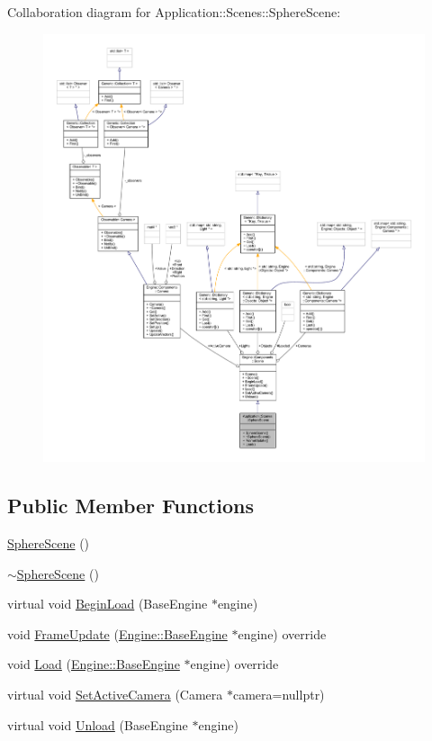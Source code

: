 Collaboration diagram for Application\+:\+:Scenes\+:\+:Sphere\+Scene\+:
\nopagebreak
\begin{figure}[H]
\begin{center}
\leavevmode
\includegraphics[width=350pt]{classApplication_1_1Scenes_1_1SphereScene__coll__graph}
\end{center}
\end{figure}
\subsection*{Public Member Functions}
\begin{DoxyCompactItemize}
\item 
\mbox{\hyperlink{classApplication_1_1Scenes_1_1SphereScene_a5880969092c7164e61a4236860c121c1}{Sphere\+Scene}} ()
\item 
\mbox{\hyperlink{classApplication_1_1Scenes_1_1SphereScene_a36617ce2362ace6514125d71d2fe41a9}{$\sim$\+Sphere\+Scene}} ()
\item 
virtual void \mbox{\hyperlink{classEngine_1_1Components_1_1Scene_af18bd334fe66952b8d79b8e9e99ab2d8}{Begin\+Load}} (Base\+Engine $\ast$engine)
\item 
void \mbox{\hyperlink{classApplication_1_1Scenes_1_1SphereScene_ad754dea94c77524a79d707436a933c66}{Frame\+Update}} (\mbox{\hyperlink{classEngine_1_1BaseEngine}{Engine\+::\+Base\+Engine}} $\ast$engine) override
\item 
void \mbox{\hyperlink{classApplication_1_1Scenes_1_1SphereScene_adf6f95bf2ac8f0e84935d04248407ba4}{Load}} (\mbox{\hyperlink{classEngine_1_1BaseEngine}{Engine\+::\+Base\+Engine}} $\ast$engine) override
\item 
virtual void \mbox{\hyperlink{classEngine_1_1Components_1_1Scene_a936218df56c481f3aa12d684cee038f3}{Set\+Active\+Camera}} (Camera $\ast$camera=nullptr)
\item 
virtual void \mbox{\hyperlink{classEngine_1_1Components_1_1Scene_a064ce89da5daa483369c3253f04c9d21}{Unload}} (Base\+Engine $\ast$engine)
\end{DoxyCompactItemize}
